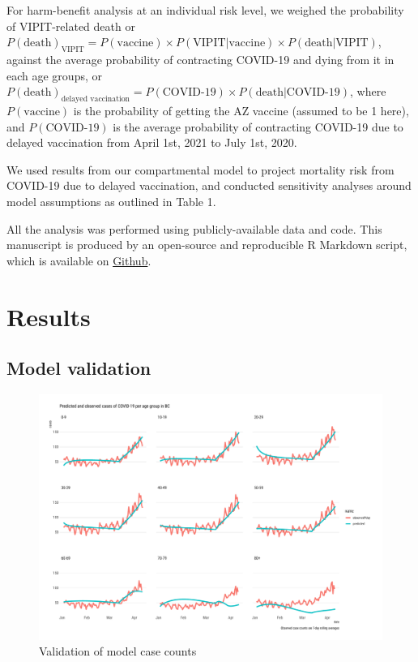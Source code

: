 \documentclass[]{elsarticle} %
\begin{document}
For harm-benefit analysis at an individual risk level, we weighed the
probability of VIPIT-related death or
\(P(\text{death})_{\text{VIPIT}} = P(\text{vaccine}) \times P(\text{VIPIT}|\text{vaccine}) \times P(\text{death}|\text{VIPIT})\),
against the average probability of contracting COVID-19 and dying from
it in each age groups, or
\(P(\text{death})_{\text{delayed vaccination}} = P(\text{COVID-19}) \times P(\text{death}|\text{COVID-19})\),
where \(P(\text{vaccine})\) is the probability of getting the AZ vaccine
(assumed to be 1 here), and \(P(\text{COVID-19})\) is the average
probability of contracting COVID-19 due to delayed vaccination from
April 1st, 2021 to July 1st, 2020.

We used results from our compartmental model to project mortality risk
from COVID-19 due to delayed vaccination, and conducted sensitivity
analyses around model assumptions as outlined in Table 1.

All the analysis was performed using publicly-available data and code.
This manuscript is produced by an open-source and reproducible R
Markdown script, which is available on
\href{https://github.com/aminadibi/astrazenecaVIPIT}{Github}.

\hypertarget{results}{%
\section{Results}\label{results}}

\hypertarget{model-validation}{%
\subsection{Model validation}\label{model-validation}}

\begin{figure}

{\centering \includegraphics[width=1\linewidth]{../figures/fig-validation} 

}

\caption{Validation of model case counts}\label{fig:figValidation}
\end{figure}
\end{document}
